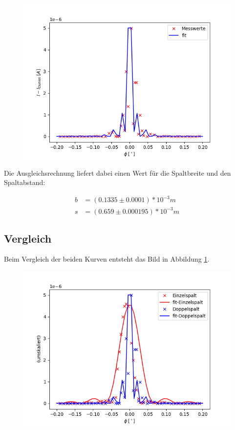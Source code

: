 \begin{figure}[H]
    \centering
    \includegraphics{doppel.png}
\end{figure}

Die Ausgleichsrechnung liefert dabei einen Wert für die Spaltbreite und den Spaltabstand:

\begin{align*}
    b &= (0.1335\pm 0.0001)* 10^{-3}m \\
    s &= (0.659\pm 0.000195)* 10^{-3}m  
\end{align*}

\subsection{Vergleich}

Beim Vergleich der beiden Kurven entsteht das Bild in Abbildung \ref{fig:Vergleich}.

\begin{figure}[H]
    \centering
    \includegraphics{vergleich.png}
    \label{fig:Vergleich}
\end{figure}



